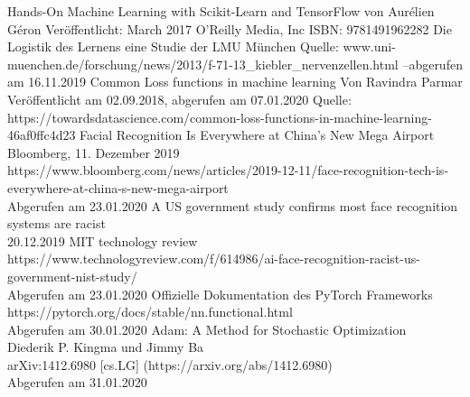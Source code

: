 \documentclass[11pt]{article}
\begin{document}
\begin{thebibliography}{99}
	Hands-On Machine Learning with Scikit-Learn and TensorFlow\newline
	von Aurélien Géron\newline
	Veröffentlicht: March 2017 O'Reilly Media, Inc\newline
	ISBN: 9781491962282
	Die Logistik des Lernens eine Studie der LMU München\newline
	Quelle: www.uni-muenchen.de/forschung/news/2013/\newline f-71-13\_kiebler\_nervenzellen.html --abgerufen am 16.11.2019
	Common Loss functions in machine learning\newline
	Von Ravindra Parmar\newline
	Veröffentlicht am 02.09.2018, abgerufen am 07.01.2020\newline
	Quelle: https://towardsdatascience.com/common-loss-functions-in-machine-learning-46af0ffc4d23 
	Facial Recognition Is Everywhere at China’s New Mega Airport\\
	Bloomberg, 11. Dezember 2019\\
	https://www.bloomberg.com/news/articles/2019-12-11/face-recognition-tech-is-everywhere-at-china-s-new-mega-airport\\
	Abgerufen am 23.01.2020
	A US government study confirms most face recognition systems are racist\\
	20.12.2019 MIT technology review\\
	https://www.technologyreview.com/f/614986/ai-face-recognition-racist-us-government-nist-study/\\
	Abgerufen am 23.01.2020
	Offizielle Dokumentation des PyTorch Frameworks\\
	https://pytorch.org/docs/stable/nn.functional.html\\
	Abgerufen am 30.01.2020
	Adam: A Method for Stochastic Optimization\\
	Diederik P. Kingma und Jimmy Ba\\
	arXiv:1412.6980 [cs.LG] (https://arxiv.org/abs/1412.6980)\\
	Abgerufen am 31.01.2020
\end{thebibliography}
\listoffigures
\end{document}

